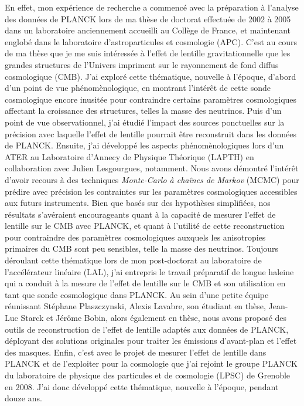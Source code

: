 \documentclass[a4paper, 12pt]{report}
\begin{document}
En effet, mon expérience de recherche a commencé avec la préparation
à l'analyse des données de PLANCK lors de ma thèse de doctorat
effectuée de 2002 à 2005 dans un laboratoire anciennement accueilli au
Collège de France, et maintenant englobé dans le laboratoire
d'astroparticules et cosmologie (APC). C'est au cours de ma thèse que
je me suis intéressée à l'effet de lentille gravitationnelle que les
grandes structures de l'Univers impriment sur le rayonnement de fond
diffus cosmologique (CMB). J'ai exploré cette thématique, nouvelle à
l'époque, d'abord d'un point de vue phénomènologique, en montrant
l'intérêt de cette sonde cosmologique encore inusitée pour contraindre
certains paramètres cosmologiques affectant la croissance des
structures, telles la masse des neutrinos. Puis d'un point de vue
observationnel, j'ai étudié l'impact des sources ponctuelles sur la
précision avec laquelle l'effet de lentille pourrait être reconstruit
dans les données de PLANCK. Ensuite, j'ai développé les aspects
phénomènologiques lors d'un ATER au Laboratoire d'Annecy de Physique
Théorique (LAPTH) en collaboration avec Julien Lesgourgues,
notamment. Nous avons démontré l'intérêt d'avoir recours à des
techniques \emph{Monte-Carlo à chaînes de Markov} (MCMC) pour prédire
avec précision les contraintes sur les paramètres cosmologiques
accessibles aux futurs instruments. Bien que basés sur des hypothèses
simplifiées, nos résultats s'avéraient encourageants quant à la
capacité de mesurer l'effet de lentille sur le CMB avec PLANCK, et
quant à l'utilité de cette reconstruction pour contraindre des
paramètres cosmologiques auxquels les anisotropies primaires du CMB
sont peu sensibles, telle la masse des neutrinos. Toujours déroulant
cette thématique lors de mon post-doctorat au laboratoire de
l'accélérateur linéaire (LAL), j'ai entrepris le travail préparatif de
longue haleine qui a conduit à la mesure de l'effet de lentille sur le
CMB et son utilisation en tant que sonde cosmologique dans PLANCK. Au
sein d'une petite équipe réunissant Stéphane Plaszczynski, Alexis
Lavabre, son étudiant en thèse, Jean-Luc Starck et Jérôme Bobin, alors
également en thèse, nous avons proposé des outils de reconstruction de
l'effet de lentille adaptés aux données de PLANCK, déployant des
solutions originales pour traiter les émissions d'avant-plan et
l'effet des masques. Enfin, c'est avec le projet de mesurer l'effet de
lentille dans PLANCK et de l'exploiter pour la cosmologie que j'ai
rejoint le groupe PLANCK du laboratoire de physique des particules et
de cosmologie (LPSC) de Grenoble en 2008. J'ai donc développé cette
thématique, nouvelle à l'époque, pendant douze ans.
\end{document}
